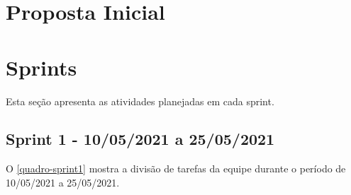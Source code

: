 
\begin{apendicesenv}

\partapendices
\chapter{Proposta Inicial}


\chapter{Sprints}
\label{sprints-atividades}

Esta seção apresenta as atividades planejadas em cada \gls{sprint}.


\section{Sprint 1 - 10/05/2021 a 25/05/2021}

O \autoref{quadro-sprint1} mostra a divisão de tarefas da equipe durante o período de 10/05/2021 a 25/05/2021.


\end{apendicesenv}
